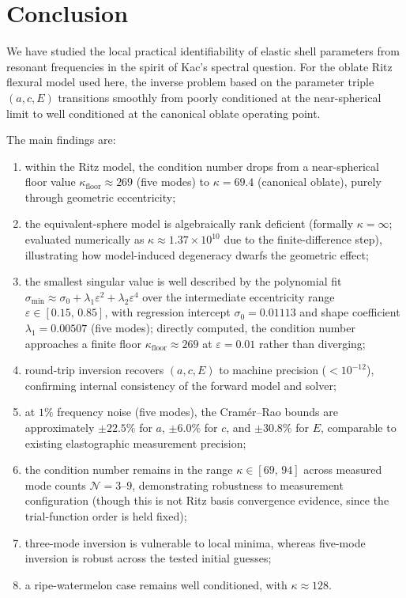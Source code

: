 \section{Conclusion}\label{sec:conclusion}

We have studied the local practical identifiability of elastic shell parameters
from resonant frequencies in the spirit of Kac's spectral question.  For the
oblate Ritz flexural model used here, the inverse problem based on the
parameter triple $(a,c,E)$ transitions smoothly from poorly conditioned at the
near-spherical limit to well conditioned at the canonical oblate operating
point.

The main findings are:
\begin{enumerate}
  \item within the Ritz model, the condition number drops from a near-spherical
  floor value $\kappa_\mathrm{floor}\approx269$ (five modes) to
  $\kappa = 69.4$ (canonical oblate), purely through geometric eccentricity;
  \item the equivalent-sphere model is algebraically rank deficient
  (formally $\kappa = \infty$; evaluated numerically as
  $\kappa \approx 1.37 \times 10^{10}$ due to the finite-difference step),
  illustrating how model-induced degeneracy
  dwarfs the geometric effect;
  \item the smallest singular value is well described by the polynomial fit
  $\sigma_{\min} \approx \sigma_0 + \lambda_1\varepsilon^2 + \lambda_2\varepsilon^4$
  over the intermediate eccentricity range $\varepsilon\in[0.15,\,0.85]$,
  with regression intercept $\sigma_0 = 0.01113$ and shape coefficient
  $\lambda_1 = 0.00507$ (five modes); directly computed, the condition
  number approaches a finite floor $\kappa_\mathrm{floor}\approx 269$
  at $\varepsilon = 0.01$ rather than diverging;
  \item round-trip inversion recovers $(a,c,E)$ to machine precision
  ($<10^{-12}$), confirming internal consistency of the forward model and
  solver;
  \item at $1\%$ frequency noise (five modes), the Cram\'er--Rao bounds are
  approximately $\pm 22.5\%$ for $a$, $\pm 6.0\%$ for $c$, and $\pm 30.8\%$
  for $E$, comparable to existing elastographic measurement precision;
  \item the condition number remains in the range $\kappa\in[69,\,94]$ across
  measured mode counts $\mathcal{N}=3$--$9$, demonstrating robustness to
  measurement configuration (though this is not Ritz basis convergence
  evidence, since the trial-function order is held fixed);
  \item three-mode inversion is vulnerable to local minima, whereas five-mode
  inversion is robust across the tested initial guesses;
  \item a ripe-watermelon case remains well conditioned, with
  $\kappa \approx 128$.
\end{enumerate}

